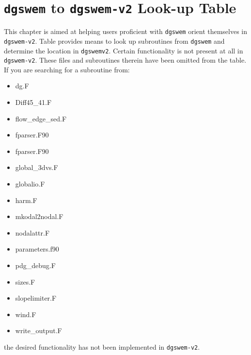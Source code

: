 \chapter{\texttt{dgswem} to \texttt{dgswem-v2} Look-up Table}
This chapter is aimed at helping users proficient with \texttt{dgswem} orient themselves in \texttt{dgswem-v2}. Table \label{tab:dgswem2dgswemv2} provides means to look up subroutines from \texttt{dgswem} and determine the location in \texttt{dgswemv2}. Certain functionality is not present at all in \texttt{dgswem-v2}. These files and subroutines therein have been omitted from the table. If you are searching for a subroutine from:
\begin{itemize}
\item dg.F
\item Diff45\_41.F
\item flow\_edge\_sed.F
\item fparser.F90
\item fparser.F90
\item global\_3dvs.F
\item globalio.F
\item harm.F
\item mkodal2nodal.F
\item nodalattr.F
\item parameters.f90
\item pdg\_debug.F
\item sizes.F
\item slopelimiter.F
\item wind.F
\item write\_output.F
\end{itemize}
the desired functionality has not been implemented in \texttt{dgswem-v2}.
\setlength\LTleft{-3.2cm}
